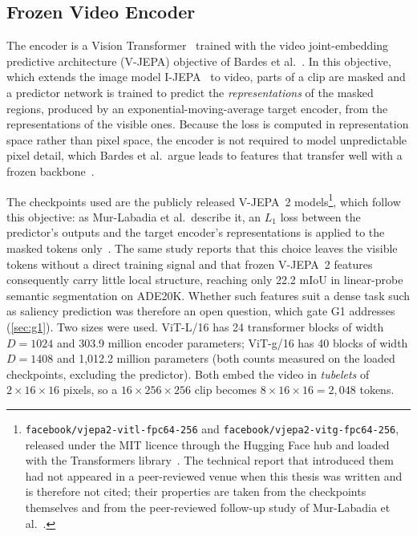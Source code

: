 \subsection{Frozen Video Encoder}\label{sec:encoder}

The encoder is a Vision Transformer~\cite{dosovitskiy2021image} trained with
the video joint-embedding predictive architecture (\acrshort{V-JEPA}) objective of Bardes
et al.~\cite{bardes2024revisiting}. In this objective, which extends the image
model I-\acrshort{JEPA}~\cite{assran2023self} to video, parts of a clip are masked and a
predictor network is trained to predict the \emph{representations} of the
masked regions, produced by an exponential-moving-average target encoder, from
the representations of the visible ones. Because the loss is computed in
representation space rather than pixel space, the encoder is not required to
model unpredictable pixel detail, which Bardes et al.\ argue leads to features
that transfer well with a frozen backbone~\cite{bardes2024revisiting}.

The checkpoints used are the publicly released \acrshort{V-JEPA}~2 models\footnote{
\texttt{facebook/vjepa2-vitl-fpc64-256} and \texttt{facebook/vjepa2-vitg-fpc64-256},
released under the MIT licence through the Hugging Face hub and loaded with the
Transformers library~\cite{wolf2020transformers}. The technical report that
introduced them had not appeared in a peer-reviewed venue when this thesis was
written and is therefore not cited; their properties are taken from the
checkpoints themselves and from the peer-reviewed follow-up study of
Mur-Labadia et al.~\cite{murlabadia2026vjepa21}.}, which follow this objective:
as Mur-Labadia et al.\ describe it, an $L_1$ loss between the predictor's
outputs and the target encoder's representations is applied to the masked
tokens only~\cite{murlabadia2026vjepa21}. The same study reports that this
choice leaves the visible tokens without a direct training signal and that
frozen \acrshort{V-JEPA}~2 features consequently carry little local structure, reaching
only 22.2 \acrshort{mIoU} in linear-probe semantic segmentation on ADE20K. Whether such
features suit a dense task such as saliency prediction was therefore an open
question, which gate G1 addresses (\cref{sec:g1}). Two sizes were used.
\acrshort{ViT}-L/16 has 24 transformer blocks of width
$D=1024$ and 303.9 million encoder parameters; \acrshort{ViT}-g/16 has 40 blocks of
width $D=1408$ and 1,012.2 million parameters (both counts measured on the
loaded checkpoints, excluding the predictor). Both embed the video in
\emph{tubelets} of $2\times16\times16$ pixels, so a $16\times256\times256$ clip
becomes $8\times16\times16=2{,}048$ tokens.

